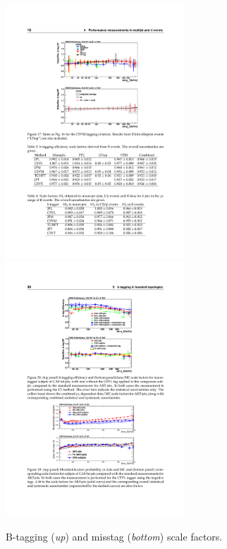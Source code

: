 \begin{figure}
\centering
\includegraphics[width=0.6\textwidth]{Figures/b-tagSF.pdf}
\includegraphics[width=0.6\textwidth]{Figures/miss-tag.pdf}
\label{fig:bSF}
\caption{B-tagging (\textit{up}) and misstag (\textit{bottom}) scale factors. \cite{CMS:2013vea}}
\end{figure}


